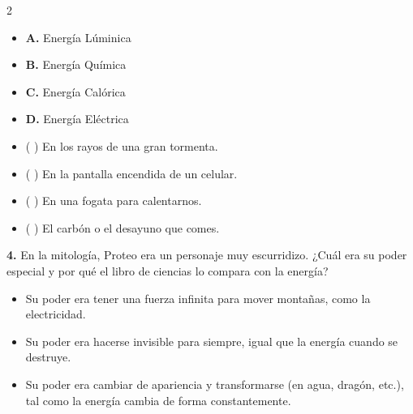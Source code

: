 \documentclass[12pt, letterpaper]{article}
\newif\ifshowanswers
\newcommand{\casillaVerdadera}{\ifshowanswers \textcolor{blue}{$\blacksquare$} \else $\square$ \fi}
\newcommand{\casillaFalsa}{\ifshowanswers $\square$ \else $\square$ \fi}
\begin{document}
	\vspace{0.3cm}
	\begin{multicols}{2}
		\begin{itemize}[itemsep=0.5cm, label={}]
			\item \textbf{A.} Energía Lúminica
			\item \textbf{B.} Energía Química
			\item \textbf{C.} Energía Calórica
			\item \textbf{D.} Energía Eléctrica
		\end{itemize}
		\columnbreak
		\begin{itemize}[itemsep=0.5cm, label={}]
			\item ( \ifshowanswers \textcolor{blue}{\textbf{D}} \else \hspace{0.5cm} \fi ) En los rayos de una gran tormenta.
			\item ( \ifshowanswers \textcolor{blue}{\textbf{A}} \else \hspace{0.5cm} \fi ) En la pantalla encendida de un celular.
			\item ( \ifshowanswers \textcolor{blue}{\textbf{C}} \else \hspace{0.5cm} \fi ) En una fogata para calentarnos.
			\item ( \ifshowanswers \textcolor{blue}{\textbf{B}} \else \hspace{0.5cm} \fi ) El carbón o el desayuno que comes.
		\end{itemize}
	\end{multicols} 
	
	\newpage
	\vspace*{0.5cm} 
	\noindent \textbf{4.} En la mitología, Proteo era un personaje muy escurridizo. ¿Cuál era su poder especial y por qué el libro de ciencias lo compara con la energía? 
	
	\vspace{0.3cm} 
	\begin{itemize}[itemsep=0.5cm] 
		\item[ \casillaFalsa ] Su poder era tener una fuerza infinita para mover montañas, como la electricidad. 
		\item[ \casillaFalsa ] Su poder era hacerse invisible para siempre, igual que la energía cuando se destruye. 
		\item[ \casillaVerdadera ] Su poder era cambiar de apariencia y transformarse (en agua, dragón, etc.), tal como la energía cambia de forma constantemente. 
	\end{itemize}
	
\end{document}
